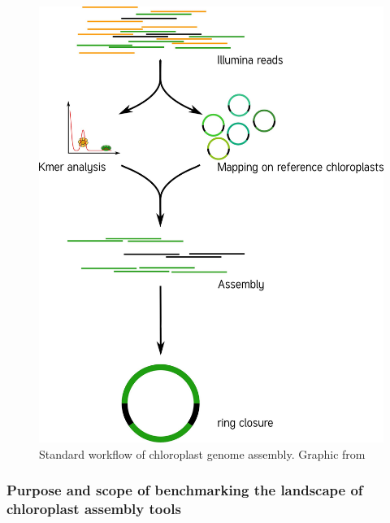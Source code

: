 \begin{figure}[H]
\centering
\includegraphics[height=.65\textheight, width=.95\textwidth]{Figures/CE_workflow}
\decoRule
\caption[Chloroplast genome assembly workflow]{Standard workflow of chloroplast genome assembly. Graphic from \cite{j_ankenbrand_chloroextractor:_2018} }
\label{fig:cpast_workflow}
\end{figure}

\subsubsection{Purpose and scope of benchmarking the landscape of chloroplast assembly tools}


